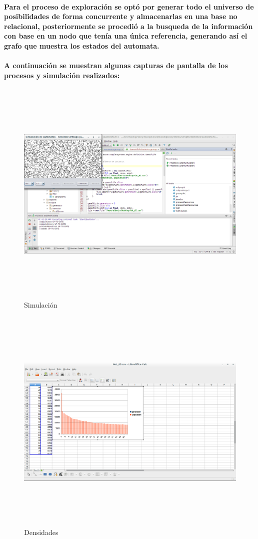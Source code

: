 	\paragraph{
		Para el proceso de exploración se optó por generar todo el universo de posibilidades de forma concurrente y almacenarlas en una base no relacional, posteriormente se procedió a la busqueda de la información con base en un nodo que tenía una única referencia, generando así el grafo que muestra los estados del automata.
	}
	\paragraph{
		A continuación se muestran algunas capturas de pantalla de los procesos y simulación realizados:
	}
	\begin{figure}[h!]
      \centering
      \includegraphics[width=15.5cm,height=11cm]{./images/simulador.png}
      \caption{Simulación}
    \end{figure}

    \begin{figure}[h!]
      \centering
      \includegraphics[width=15.5cm,height=11cm]{./images/densidades.png}
      \caption{Densidades}
    \end{figure}